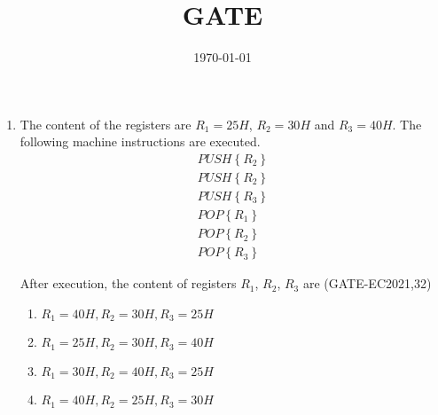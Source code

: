 \documentclass[2pt,-letter paper]{article}
\title{GATE}
\date{\today}
\providecommand{\cbrak}[1]{\ensuremath{\left\{#1\right\}}}
\begin{document}
\maketitle
\begin{enumerate}

\item The content of the registers are $R_1 = 25H$, $R_2 = 30H$ and $R_3 = 40H$. The following machine instructions are executed.
\begin{align*}
  PUSH \cbrak {R_2}  
  \\PUSH \cbrak {R_2}
  \\PUSH \cbrak {R_3} 
  \\POP \cbrak {R_1} 
  \\POP \cbrak {R_2} 
  \\POP \cbrak {R_3} 
\end{align*}

After execution, the content of registers $R_1$, $R_2$, $R_3$ are
\hfill(GATE-EC2021,32)

\begin{enumerate}
    \item $R_1 = 40H, R_2 = 30H,R_3 = 25H$
    \item $R_1 = 25H, R_2 = 30H,R_3 = 40H$
    \item $R_1 = 30H, R_2 = 40H,R_3 = 25H$
    \item $R_1 = 40H, R_2 = 25H,R_3 = 30H$
\end{enumerate}
\end{enumerate}
\end{document}

